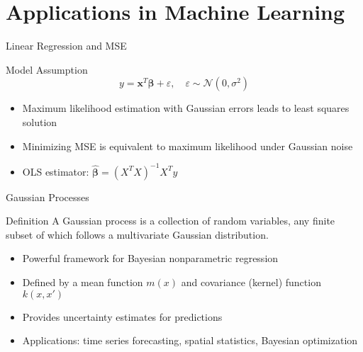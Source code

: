 \documentclass{beamer}
\begin{document}
\section{Applications in Machine Learning}

\begin{frame}{Linear Regression and MSE}
  \begin{block}{Model Assumption}
    \[
    y = \mathbf{x}^T\boldsymbol{\beta} + \varepsilon, \quad \varepsilon \sim \mathcal{N}(0, \sigma^2)
    \]
  \end{block}
  
  \begin{itemize}
    \item Maximum likelihood estimation with Gaussian errors leads to least squares solution
    \item Minimizing MSE is equivalent to maximum likelihood under Gaussian noise
    \item OLS estimator: $\hat{\boldsymbol{\beta}} = (X^T X)^{-1} X^T y$
  \end{itemize}
\end{frame}

\begin{frame}{Gaussian Processes}
  \begin{block}{Definition}
    A Gaussian process is a collection of random variables, any finite subset of which follows a multivariate Gaussian distribution.
  \end{block}
  
  \begin{itemize}
    \item Powerful framework for Bayesian nonparametric regression
    \item Defined by a mean function $m(x)$ and covariance (kernel) function $k(x, x')$
    \item Provides uncertainty estimates for predictions
    \item Applications: time series forecasting, spatial statistics, Bayesian optimization
  \end{itemize}
\end{frame}
\end{document}
